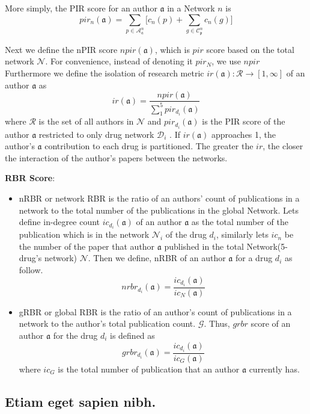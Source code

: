 \documentclass[10pt,letterpaper]{article}
\begin{document}
More simply, the PIR score for an author  $\mathfrak{a}$ in a Network $n$ is  $$ pir_n(\mathfrak{a}) =  \sum_{p\in \mathcal{A}_a^n } \big[c_n(p) + \sum_{g\in \mathcal{C}_\mathfrak{p}^n}  c_n(g)\big] $$

Next we define the nPIR score $npir(\mathfrak{a})$, which is $pir$ score based on the  total network $\mathcal{N}$. For convenience, instead of denoting it $pir_N$, we use $npir$   Furthermore  we define the isolation of  research  metric $ir(\mathfrak{a}):\mathcal{R}\rightarrow [1,\infty]$  of an author $\mathfrak{a}$ as 
$$ir(\mathfrak{a})= \dfrac{ npir({\mathfrak{a}})} {\sum_{1}^{5} pir_{d_i}(\mathfrak{a})} $$
where $\mathcal{R}$ is the set of all authors in $\mathcal{N}$  and  $pir_{d_i}(\mathfrak{a})$ is the PIR score of the author $\mathfrak{a}$ restricted to only drug network $\mathcal{D}_i$ . If $ir(\mathfrak{a})$ approaches 1, the author's $\mathfrak{a}$ contribution to each drug is partitioned. The greater the $ir$, the closer  the interaction of the author's papers between the networks. 

\textbf{RBR Score}:
\begin{itemize}
\item nRBR or network RBR is the ratio of an authors' count of publications in a network to the total number of the publications in the global Network. 
Lets define in-degree count $ic_{d_i}(\mathfrak{a})$ of an author $\mathfrak{a}$ as the total number of the publication which is in the network $\mathcal{N}_i$ of the drug $d_i$, similarly lets $ic_{n}$ be the number of the paper that author $\mathfrak{a}$ published in the total Network(5-drug's network) $\mathcal{N}$. Then we define, nRBR of an author $\mathfrak{a}$  for a drug $d_i$ as follow.
$$ nrbr_{d_i}(\mathfrak{a}) = \dfrac{ic_{d_i}(\mathfrak{a})}{ic_{N}(\mathfrak{a})}$$
\item gRBR or global RBR is the ratio of an author's count of publications in a network to the author's total publication count. $\mathcal{G}$. Thus, $grbr$ score of an author  $\mathfrak{a}$  for the drug $d_i$ is defined as 
$$grbr_{d_i}(\mathfrak{a}) = \dfrac{ic_{d_i}(\mathfrak{a})}{ic_{G}(\mathfrak{a})}$$
where $ic_{G}$ is the total number of publication that an author $\mathfrak{a}$ currently has.
\end{itemize}

\subsection*{Etiam eget sapien nibh.}
\end{document}
